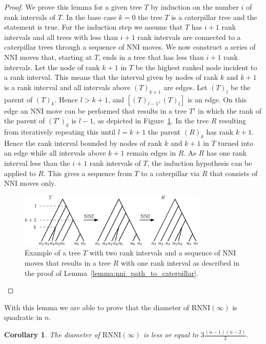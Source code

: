 \documentclass[11pt]{amsart}
\newtheorem{corollary}{Corollary}
\newcommand{\rnni}{\mathrm{RNNI}}
\newcommand{\nni}{\mathrm{NNI}}
\begin{document}
\begin{proof}
	We prove this lemma for a given tree $T$ by induction on the number $i$ of rank intervals of $T$.
	In the base case $k = 0$ the tree $T$ is a caterpillar tree and the statement is true.
	For the induction step we assume that $T$ has $i+1$ rank intervals and all trees with less than $i+1$ rank intervals are connected to a caterpillar trees through a sequence of $\nni$ moves.
	We now construct a series of $\nni$ moves that, starting at $T$, ends in a tree that has less than $i+1$ rank intervals.
	Let the node of rank $k+1$ in $T$ be the highest ranked node incident to a rank interval.
	This means that the interval given by nodes of rank $k$ and $k+1$ is a rank interval and all intervals above $(T)_{k+1}$ are edges.
	Let $(T)_l$ be the parent of $(T)_k$.
	Hence $l > k+1$, and $[(T)_{l-1}, (T)_{l}]$ is an edge.
	On this edge an $\nni$ move can be performed that results in a tree $T'$ in which the rank of the parent of $(T')_k$ is $l-1$, as depicted in Figure~\ref{fig:nni_path_caterpillar}.
	In the tree $R$ resulting from iteratively repeating this until $l = k+1$ the parent $(R)_k$ has rank $k+1$.
	Hence the rank interval bounded by nodes of rank $k$ and $k+1$ in $T$ turned into an edge while all intervals above $k+1$ remain edges in $R$.
	As $R$ has one rank interval less than the $i+1$ rank intervals of $T$, the induction hypothesis can be applied to $R$.
	This gives a sequence from $T$ to a caterpillar via $R$ that consists of $\nni$ moves only.
	\begin{figure}[ht]
		\includegraphics[width=0.8\textwidth]{nni_path_caterpillar.eps}
		\caption{Example of a tree $T$ with two rank intervals and a sequence of $\nni$ moves that results in a tree $R$ with one rank interval as described in the proof of Lemma~\ref{lemma:nni_path_to_caterpillar}.}
		\label{fig:nni_path_caterpillar}
	\end{figure}
\end{proof}

With this lemma we are able to prove that the diameter of $\rnni(\infty)$ is quadratic in $n$.
\begin{corollary}
	The diameter of $\rnni(\infty)$ is less or equal to $3 \frac{(n-1)(n-2)}{2}$.
\end{corollary}
\end{document}
